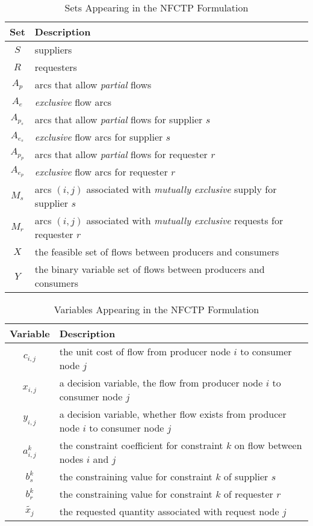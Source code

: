 \begin{table} [h!]
\centering
\begin{tabularx}{\columnwidth-10pt}{|c|X|} %
\hline
Set         & Description \\
\hline
$S$     & suppliers \\
$R$     & requesters \\
$A_p$     & arcs that allow \textit{partial} flows \\
$A_e$     & \textit{exclusive} flow arcs  \\
$A_{p_s}$     & arcs that allow \textit{partial} flows for supplier $s$ \\
$A_{e_s}$     & \textit{exclusive} flow arcs for supplier $s$ \\
$A_{p_p}$     & arcs that allow \textit{partial} flows for requester $r$ \\
$A_{e_p}$     & \textit{exclusive} flow arcs for requester $r$ \\
$M_s$     & arcs $(i, j)$ associated with \textit{mutually exclusive} supply for supplier $s$ \\
$M_r$     & arcs $(i, j)$ associated with \textit{mutually exclusive} requests for requester $r$ \\
$X$         & the feasible set of flows between producers and consumers  \\
$Y$         & the binary variable set of flows between producers and consumers  \\
\hline
\end{tabularx}
\caption{Sets Appearing in the NFCTP Formulation}
\label{tbl:NFCTP-sets}
\end{table}

\begin{table} [h!]
\centering
\begin{tabularx}{\columnwidth-10pt}{|c|X|} %
\hline
Variable    & Description \\
\hline
$c_{i,j}$             & the unit cost of flow
                          from producer node $i$ to consumer node $j$  \\
$x_{i,j}$             & a decision variable, the flow 
                          from producer node $i$ to consumer node $j$  \\
$y_{i,j}$             & a decision variable, whether flow exists 
                          from producer node $i$ to consumer node $j$  \\
$a_{i,j}^k$ & the constraint coefficient for constraint $k$ 
                          on flow between nodes $i$ and $j$  \\
$b_s^k$   & the constraining value for constraint $k$ of supplier $s$ \\
$b_r^k$   & the constraining value for constraint $k$ of requester $r$ \\
$\tilde{x_j}$ & the requested quantity associated with request node $j$ \\
\hline
\end{tabularx}
\caption{Variables Appearing in the NFCTP Formulation}
\label{tbl:NFCTP-vars}
\end{table}

